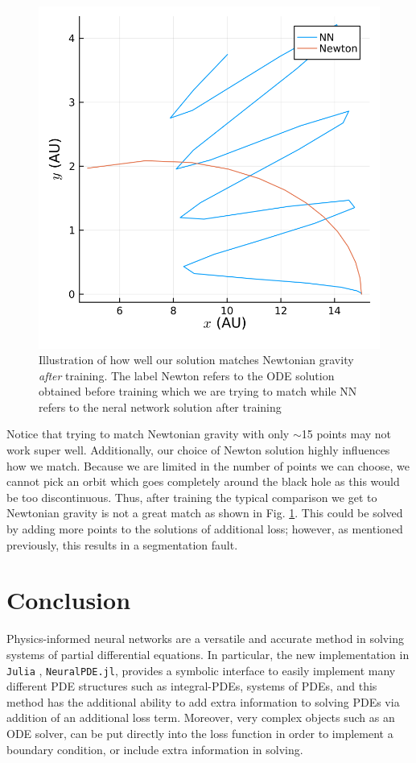 \documentclass{CUP-JNL-DTM}%
\theoremstyle{definition}
\numberwithin{equation}{section}
\newcommand{\Julia}{\texttt{Julia} }
\begin{document}
\begin{figure}
    \centering
    \includegraphics[width=0.3\linewidth]{figures/compare_to_newton.png}
    \caption{Illustration of how well our solution matches Newtonian gravity \emph{after} training. The label Newton refers to the ODE solution obtained before training which we are trying to match while NN refers to the neral network solution after training}
    \label{fig:compare_newton}
\end{figure}

Notice that trying to match Newtonian gravity with only $\sim$15 points may not work super well. Additionally, our choice of Newton solution highly influences how we match. Because we are limited in the number of points we can choose, we cannot pick an orbit which goes completely around the black hole as this would be too discontinuous. Thus, after training the typical comparison we get to Newtonian gravity is not a great match as shown in Fig. \ref{fig:compare_newton}. This could be solved by adding more points to the solutions of additional loss; however, as mentioned previously, this results in a segmentation fault. 


\section{Conclusion}

Physics-informed neural networks are a versatile and accurate method in solving systems of partial differential equations. In particular, the new implementation in \Julia, \texttt{NeuralPDE.jl}, provides a symbolic interface to easily implement many different PDE structures such as integral-PDEs, systems of PDEs, and this method has the additional ability to add extra information to solving PDEs via addition of an additional loss term. Moreover, very complex objects such as an ODE solver, can be put directly into the loss function in order to implement a boundary condition, or include extra information in solving. 
\end{document}
